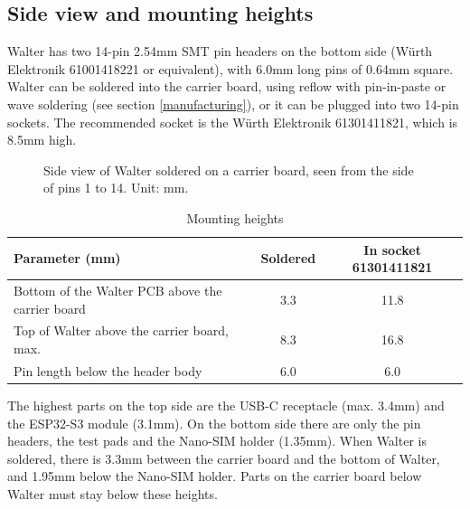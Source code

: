 \documentclass[11pt]{article}
\begin{document}
\begin{table}[H]
\centering
\renewcommand{\arraystretch}{1.15}

\caption{\label{table_mech_positions}Position of connectors and components, numbers refer to Figure \ref{fig:mechanical_views}}
\end{table}

\subsection{Side view and mounting heights} \label{mech_side}
Walter has two 14-pin 2.54mm SMT pin headers on the bottom side (Würth Elektronik 61001418221 or equivalent), with 6.0mm long pins of 0.64mm square. Walter can be soldered into the carrier board, using reflow with pin-in-paste or wave soldering (see section \ref{manufacturing}), or it can be plugged into two 14-pin sockets. The recommended socket is the Würth Elektronik 61301411821, which is 8.5mm high.

\begin{figure}[H]
    \centering
    
    \caption{Side view of Walter soldered on a carrier board, seen from the side of pins 1 to 14. Unit: mm.}
    \label{fig:mechanical_side}
\end{figure}

\begin{table}[H]
\begin{center}
\renewcommand{\arraystretch}{1.3}
\begin{tabular}{|l|c|c|}
\hline
{\bf Parameter (mm)} & {\bf Soldered} & {\bf In socket 61301411821} \\
\hline
\hline
Bottom of the Walter PCB above the carrier board & 3.3 & 11.8 \\
\hline
Top of Walter above the carrier board, max. & 8.3 & 16.8 \\
\hline
Pin length below the header body & 6.0 & 6.0 \\
\hline
\end{tabular}
\caption{\label{table_mounting_heights}Mounting heights}
\end{center}
\end{table}

The highest parts on the top side are the USB-C receptacle (max. 3.4mm) and the ESP32-S3 module (3.1mm). On the bottom side there are only the pin headers, the test pads and the Nano-SIM holder (1.35mm). When Walter is soldered, there is 3.3mm between the carrier board and the bottom of Walter, and 1.95mm below the Nano-SIM holder. Parts on the carrier board below Walter must stay below these heights.\\
\end{document}
